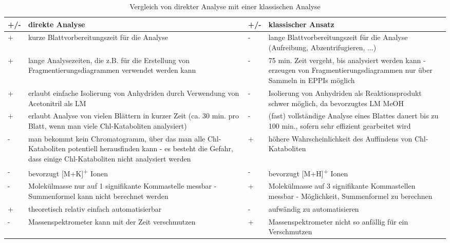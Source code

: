 \begin{table*}[!htbp]\centering
  
  \begin{tabular}{C{1cm}C{6cm}C{1cm}C{6cm}}\toprule
 +/- & direkte Analyse & +/- & klassischer Ansatz \\
\midrule
{} + & kurze Blattvorbereitungszeit für die Analyse & - & lange Blattvorbereitungszeit für die Analyse (Aufreibung, Abzentrifugieren, ...) \\
 + & lange Analysezeiten, die z.B. für die Erstellung von Fragmentierungsdiagrammen verwendet werden kann & - & 75 min. Zeit vergeht, bis analysiert werden kann - erzeugen von Fragmentierungsdiagrammen nur über Sammeln in EPPIs möglich \\ 
 + & erlaubt einfache Isolierung von Anhydriden durch Verwendung von Acetonitril als LM & - & Isolierung von Anhydriden als Reaktionsprodukt schwer möglich, da bevorzugtes LM MeOH \\
 + & erlaubt Analyse von vielen Blättern in kurzer Zeit (ca. 30 min. pro Blatt, wenn man viele Chl-Kataboliten analysiert) & - & (fast) vollständige Analyse eines Blattes dauert bis zu 100 min., sofern sehr effizient gearbeitet wird \\ 
 - & man bekommt kein Chromatogramm, über das man alle Chl-Kataboliten potentiell herausfinden kann - es besteht die Gefahr, dass einige Chl-Kataboliten nicht analysiert werden & + & höhere Wahrscheinlichkeit des Auffindens von Chl-Kataboliten \\
 - & bevorzugt [M+K]\textsuperscript{+} Ionen & - & bevorzugt [M+H]\textsuperscript{+} Ionen \\ 
 - & Molekülmasse nur auf 1 signifikante Kommastelle messbar - Summenformel kann nicht berechnet werden & + & Molekülmasse auf 3 signifikante Kommastellen messbar - Möglichkeit, Summenformel zu berechnen \\
 + & theoretisch relativ einfach automatisierbar & - & aufwändig zu automatisieren \\ 
  - & Massenspektrometer kann mit der Zeit verschmutzen & + & Massenspektrometer nicht so anfällig für ein Verschmutzen \\
\bottomrule
  \end{tabular}
  
  \caption[Vergleich beider Methoden, Quelle: Autor]{Vergleich von direkter Analyse mit einer klassischen Analyse}
  \label{tab:ComparisonDirectClassic}
\end{table*}

